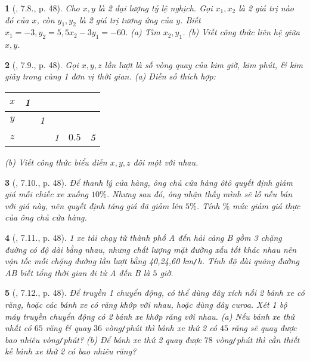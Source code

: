\documentclass{article}
\newtheorem{baitoan}{}
\begin{document}
\begin{baitoan}[\cite{Binh_boi_duong_Toan_7_tap_1}, 7.8., p. 48]
	Cho $x,y$ là 2 đại lượng tỷ lệ nghịch. Gọi $x_1,x_2$ là 2 giá trị nào đó của $x$, còn $y_1,y_2$ là 2 giá trị tương ứng của $y$. Biết $x_1 = -3,y_2 = 5,5x_2 - 3y_1 = -60$. (a) Tìm $x_2,y_1$. (b) Viết công thức liên hệ giữa $x,y$.
\end{baitoan}

\begin{baitoan}[\cite{Binh_boi_duong_Toan_7_tap_1}, 7.9., p. 48]
	Gọi $x,y,z$ lần lượt là số vòng quay của kim giờ, kim phút, \& kim giây trong cùng 1 đơn vị thời gian. (a) Điền số thích hợp:
	\begin{table}[H]
		\centering
		\begin{tabular}{|c|c|c|c|c|c|}
			\hline
			$x$ & 1 &  &  &  &  \\
			\hline
			$y$ &  & 1 &  &  &  \\
			\hline
			$z$ &  &  & 1 & $0.5$ & 5 \\
			\hline
		\end{tabular}
	\end{table}
	\noindent(b) Viết công thức biểu diễn $x,y,z$ đôi một với nhau.
\end{baitoan}

\begin{baitoan}[\cite{Binh_boi_duong_Toan_7_tap_1}, 7.10., p. 48]
	Để thanh lý cửa hàng, ông chủ cửa hàng ôtô quyết định giảm giá mỗi chiếc xe xuống $10\%$. Nhưng sau đó, ông nhận thấy mình sẽ lỗ nếu bán với giá này, nên quyết định tăng giá đã giảm lên $5\%$. Tính $\%$ mức giảm giá thực của ông chủ cửa hàng.
\end{baitoan}

\begin{baitoan}[\cite{Binh_boi_duong_Toan_7_tap_1}, 7.11., p. 48]
	1 xe tải chạy từ thành phố A đến hải cảng B gồm 3 chặng đường có độ dài bằng nhau, nhưng chất lượng mặt đường xấu tốt khác nhau nên vận tốc mỗi chặng đường lần lượt bằng {\rm40,24,60 km{\tt/}h}. Tính độ dài quãng đường AB biết tổng thời gian đi từ A đến B là $5$ giờ.
\end{baitoan}

\begin{baitoan}[\cite{Binh_boi_duong_Toan_7_tap_1}, 7.12., p. 48]
	Để truyền 1 chuyển động, có thể dùng dây xích nối 2 bánh xe có răng, hoặc các bánh xe có răng khớp với nhau, hoặc dùng dây curoa. Xét 1 bộ máy truyền chuyển động có 2 bánh xe khớp răng với nhau. (a) Nếu bánh xe thứ nhất có $65$ răng \& quay $36$ vòng{\tt/}phút thì bánh xe thứ 2 có $45$ răng sẽ quay được bao nhiêu vòng{\tt/}phút? (b) Để bánh xe thứ 2 quay được $78$ vòng{\tt/}phút thì cần thiết kế bánh xe thứ 2 có bao nhiêu răng?
\end{baitoan}
\end{document}
